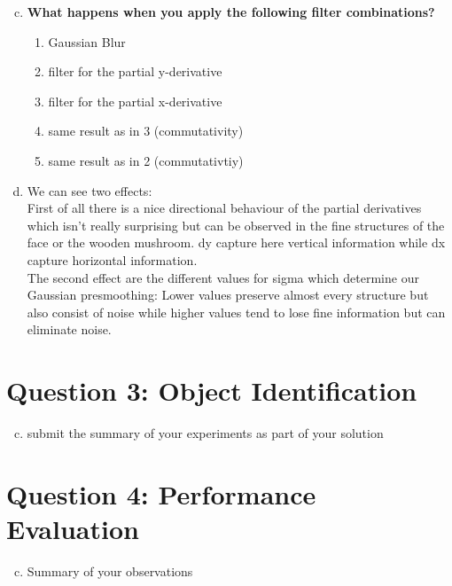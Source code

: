 \documentclass[12pt]{article}
\begin{document}
\begin{enumerate}[a)]
    \setcounter{enumi}{2}
    \item 
        \textbf{What happens when you apply the following filter combinations?}\\
        \begin{enumerate}[1.]
            \item 
                Gaussian Blur
            \item
                filter for the partial y-derivative
            \item
                filter for the partial x-derivative
            \item
                same result as in 3 (commutativity)
            \item 
                same result as in 2 (commutativtiy)
        \end{enumerate}

    \item
        We can see two effects:\\
        First of all there is a nice directional behaviour of the partial derivatives which isn't really surprising but can be observed in the fine structures of the face or the wooden mushroom. dy capture here vertical information while dx capture horizontal information.\\
        The second effect are the different values for sigma which determine our Gaussian presmoothing: Lower values preserve almost every structure but also consist of noise while higher values tend to lose fine information but can eliminate noise.
\end{enumerate}


\section*{Question 3: Object Identification}

\begin{enumerate}[a)]
    \setcounter{enumi}{2}
    \item 
        submit the summary of your experiments as part of your solution
\end{enumerate}


\section*{Question 4: Performance Evaluation}

\begin{enumerate}[a)]
    \setcounter{enumi}{2}
    \item 
        Summary of your observations
\end{enumerate}
\end{document}
